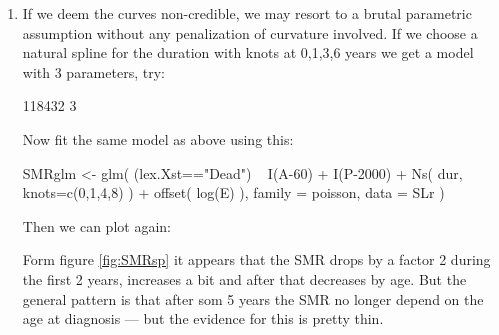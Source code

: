 \begin{enumerate}[resume]
\item If we deem the curves non-credible, we may resort to a brutal
  parametric assumption without any penalization of curvature
  involved. If we choose a natural spline for the duration with knots
  at 0,1,3,6 years we get a model with 3 parameters, try:
\begin{Schunk}
\begin{Soutput}
[1] 118432      3
\end{Soutput}
\end{Schunk}
  Now fit the same model as above using this:
\begin{Schunk}
\begin{Sinput}
 SMRglm <- glm( (lex.Xst=="Dead") ~ I(A-60) + 
                                    I(P-2000) + 
                                    Ns( dur, knots=c(0,1,4,8) ) +
                                    offset( log(E) ),
                family = poisson,
                  data = SLr )
\end{Sinput}
\end{Schunk}
Then we can plot again:
\begin{Schunk}
\end{Schunk}
 Form figure
\ref{fig:SMRsp} it appears that the SMR drops by a factor 2 during the
first 2 years, increases a bit and after that decreases by age. But
the general pattern is that after som 5 years the SMR no longer depend
on the age at diagnosis --- but the evidence for this is pretty thin.

\end{enumerate}
